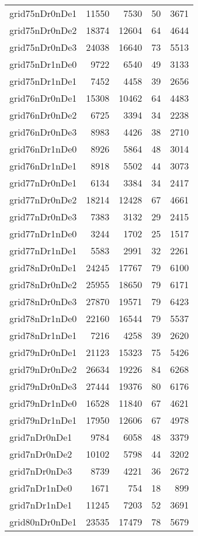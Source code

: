 \begin{tabular}{lrrrr}
grid75nDr0nDe1 & 11550 & 7530 & 50 & 3671 \\
grid75nDr0nDe2 & 18374 & 12604 & 64 & 4644 \\
grid75nDr0nDe3 & 24038 & 16640 & 73 & 5513 \\
grid75nDr1nDe0 & 9722 & 6540 & 49 & 3133 \\
grid75nDr1nDe1 & 7452 & 4458 & 39 & 2656 \\
grid76nDr0nDe1 & 15308 & 10462 & 64 & 4483 \\
grid76nDr0nDe2 & 6725 & 3394 & 34 & 2238 \\
grid76nDr0nDe3 & 8983 & 4426 & 38 & 2710 \\
grid76nDr1nDe0 & 8926 & 5864 & 48 & 3014 \\
grid76nDr1nDe1 & 8918 & 5502 & 44 & 3073 \\
grid77nDr0nDe1 & 6134 & 3384 & 34 & 2417 \\
grid77nDr0nDe2 & 18214 & 12428 & 67 & 4661 \\
grid77nDr0nDe3 & 7383 & 3132 & 29 & 2415 \\
grid77nDr1nDe0 & 3244 & 1702 & 25 & 1517 \\
grid77nDr1nDe1 & 5583 & 2991 & 32 & 2261 \\
grid78nDr0nDe1 & 24245 & 17767 & 79 & 6100 \\
grid78nDr0nDe2 & 25955 & 18650 & 79 & 6171 \\
grid78nDr0nDe3 & 27870 & 19571 & 79 & 6423 \\
grid78nDr1nDe0 & 22160 & 16544 & 79 & 5537 \\
grid78nDr1nDe1 & 7216 & 4258 & 39 & 2620 \\
grid79nDr0nDe1 & 21123 & 15323 & 75 & 5426 \\
grid79nDr0nDe2 & 26634 & 19226 & 84 & 6268 \\
grid79nDr0nDe3 & 27444 & 19376 & 80 & 6176 \\
grid79nDr1nDe0 & 16528 & 11840 & 67 & 4621 \\
grid79nDr1nDe1 & 17950 & 12606 & 67 & 4978 \\
grid7nDr0nDe1 & 9784 & 6058 & 48 & 3379 \\
grid7nDr0nDe2 & 10102 & 5798 & 44 & 3202 \\
grid7nDr0nDe3 & 8739 & 4221 & 36 & 2672 \\
grid7nDr1nDe0 & 1671 & 754 & 18 & 899 \\
grid7nDr1nDe1 & 11245 & 7203 & 52 & 3691 \\
grid80nDr0nDe1 & 23535 & 17479 & 78 & 5679 \\

\end{tabular}
